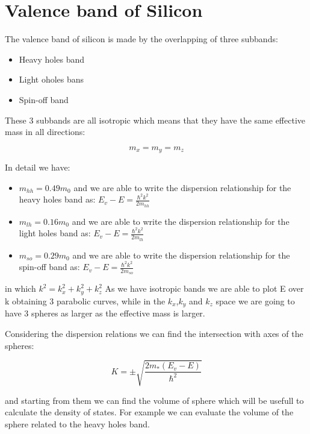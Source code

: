 
\chapter{Valence band of Silicon} %

	\label{cha:valence_band_of_silicon}

	The valence band of silicon is made by the overlapping of three subbands:
	
	\begin{itemize}
		\item Heavy holes band
		\item Light oholes bans
		\item Spin-off band
	\end{itemize}

	These 3 subbands are all isotropic which means that they have the same effective mass in all directions:
	
	\begin{equation}
		m_x=m_y=m_z
	\end{equation}

	In detail we have:
	
	\begin{itemize}
		\item $m_{hh}=0.49m_0$ and we are able to write the dispersion relationship for the heavy holes band as: $E_v-E=\frac{\hbar^2k^2}{2m_{hh}}$
		\item $m_{lh}=0.16m_0$ and we are able to write the dispersion relationship for the light holes band as: $E_v-E=\frac{\hbar^2k^2}{2m_{lh}}$
		\item $m_{so}=0.29m_0$ and we are able to write the dispersion relationship for the spin-off band as: $E_v-E=\frac{\hbar^2k^2}{2m_{so}}$
	\end{itemize}
	
	in which $k^2=k_x^2+k_y^2+k_z^2$
	As we have isotropic bands we are able to plot E over k obtaining 3 parabolic curves, while in the $k_x$,$k_y$ and $k_z$ space we are going to have 3 spheres as larger as the effective mass is larger.

	Considering the dispersion relations we can find the intersection with axes of the spheres:
	
	\begin{equation}
		K=\pm \sqrt{\frac{2m_*(E_v-E)}{\hbar^2}}
	\end{equation}
	
	and starting from them we can find the volume of sphere which will be usefull to calculate the density of states.
	For example we can evaluate the volume of the sphere related to the heavy holes band.
	
